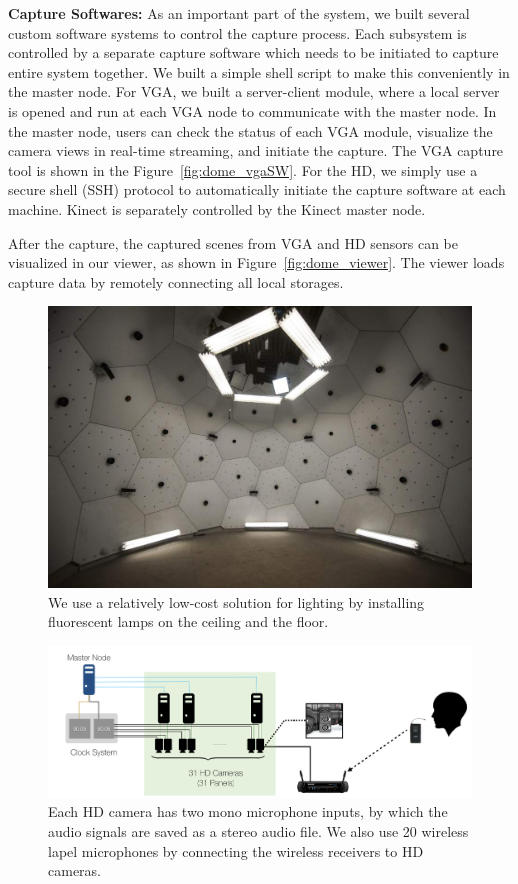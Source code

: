 \noindent \textbf{Capture Softwares:} As an important part of the system, we built several custom software systems to control the capture process. Each subsystem is controlled by a separate capture software which needs to be initiated to capture entire system together. We built a simple shell script to make this conveniently in the master node. For VGA, we built a server-client module, where a local server is opened and run at each VGA node to communicate with the master node. In the master node, users can check the status of each VGA module, visualize the camera views in real-time streaming, and initiate the capture. The VGA capture tool is shown in the Figure~\ref{fig:dome_vgaSW}. For the HD, we simply use a secure shell (SSH) protocol to automatically initiate the capture software at each machine. Kinect is separately controlled by the Kinect master node.

After the capture, the captured scenes from VGA and HD sensors can be visualized in our viewer, as shown in Figure~\ref{fig:dome_viewer}. The viewer loads capture data by remotely connecting all local storages. 

\begin{figure}
	\includegraphics[width=\linewidth]{fig_system/dome_lighting}
	\caption{We use a relatively low-cost solution for lighting by installing fluorescent lamps on the ceiling and the floor.}
	\label{fig:dome_lighting}
\end{figure}

\begin{figure}
	\includegraphics[width=\linewidth]{fig_system/dome_mic}
	\caption{Each HD camera has two mono microphone inputs, by which the audio signals are saved as a stereo audio file. We also use 20 wireless lapel microphones by connecting the wireless receivers to HD cameras.}
	\label{fig:dome_mic}
\end{figure}


